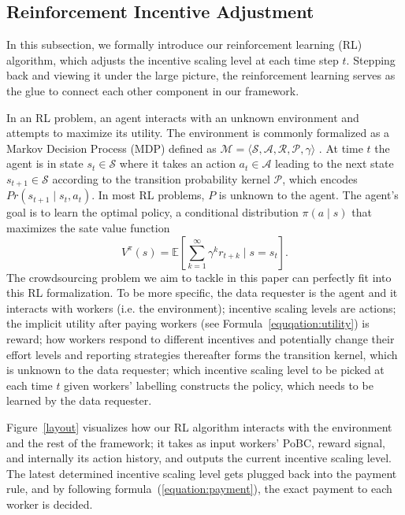 \subsection{Reinforcement Incentive Adjustment}
In this subsection, we formally introduce our reinforcement learning (RL) algorithm, which adjusts the incentive scaling level at each time step $t$. Stepping back and viewing it under the large picture, the reinforcement learning serves as the glue to connect each other component in our framework.

In an RL problem, an agent interacts with an unknown environment and attempts to maximize its utility. The environment is commonly formalized as a Markov Decision Process (MDP) defined as $\mathcal{M} = \langle \mathcal{S}, \mathcal{A}, \mathcal{R}, \mathcal{P}, \gamma\rangle$ \cite{}. At time $t$ the agent is in state $s_t \in \mathcal{S}$ where it takes an action $a_t \in \mathcal{A}$ leading to the next state $s_{t+1} \in \mathcal{S}$ according to the transition probability kernel $\mathcal{P}$, which encodes $Pr(s_{t+1}\mid s_t,a_t)$. In most RL problems, $P$ is unknown to the agent. The agent's goal is to learn the optimal policy, a conditional distribution $\pi(a \mid s)$ that  maximizes the sate value function 
$$
V^\pi(s) = \mathbb{E} \left[ \sum_{k=1}^\infty \gamma^k r_{t+k} \mid s = s_t   \right].
$$
The  crowdsourcing problem we aim to tackle in this paper can perfectly fit into this RL formalization. To be more specific, the data requester is the agent and it interacts with workers (i.e. the environment); incentive scaling levels are actions; %
the implicit utility after paying workers (see Formula~\ref{equqation:utility}) is reward; how workers respond to different incentives and potentially change their effort levels and reporting strategies thereafter forms the transition kernel, which is unknown to the data requester; which incentive scaling level to be picked at each time $t$ given workers' labelling constructs the policy, which needs to be learned by the data requester.

 Figure~\ref{layout} visualizes how our RL algorithm interacts with the environment and the rest of the framework;  it takes as input workers' PoBC, reward signal, and internally its action history, and outputs the current incentive scaling level. The latest determined incentive scaling level gets plugged back into the payment rule, and by following formula~(\ref{equation:payment}), the exact payment to each worker is decided.  
 
